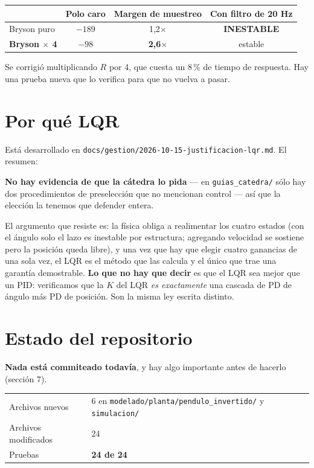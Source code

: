 \documentclass[11pt,a4paper]{article}
\begin{document}
\begin{center}\small
\begin{tabular}{lccc}
\toprule
 & Polo caro & Margen de muestreo & Con filtro de 20 Hz \\
\midrule
Bryson puro & $-189$ & 1,2$\times$ & \textbf{INESTABLE} \\
\textbf{Bryson $\times$ 4} & $-98$ & \textbf{2,6$\times$} & estable \\
\bottomrule
\end{tabular}
\end{center}

Se corrigió multiplicando $R$ por 4, que cuesta un 8\,\% de tiempo de respuesta. Hay una prueba nueva
que lo verifica para que no vuelva a pasar.

\section{Por qué LQR}

Está desarrollado en \texttt{docs/gestion/2026-10-15-justificacion-lqr.md}. El resumen:

\textbf{No hay evidencia de que la cátedra lo pida} --- en \texttt{guias\_catedra/} sólo hay dos
procedimientos de preselección que no mencionan control --- así que la elección la tenemos que
defender entera.

El argumento que resiste es: la física obliga a realimentar los cuatro estados (con el ángulo solo el
lazo es inestable por estructura; agregando velocidad se sostiene pero la posición queda libre), y una
vez que hay que elegir cuatro ganancias de una sola vez, el LQR es el método que las calcula y el
único que trae una garantía demostrable. \textbf{Lo que no hay que decir} es que el LQR sea mejor que
un PID: verificamos que la $K$ del LQR \emph{es exactamente} una cascada de PD de ángulo más PD de
posición. Son la misma ley escrita distinto.

\section{Estado del repositorio}

\textbf{Nada está commiteado todavía}, y hay algo importante antes de hacerlo (sección 7).

\begin{center}\small
\begin{tabular}{ll}
\toprule
Archivos nuevos & 6 en \texttt{modelado/planta/pendulo\_invertido/} y \texttt{simulacion/} \\
Archivos modificados & 24 \\
Pruebas & \textbf{24 de 24} \\
\bottomrule
\end{tabular}
\end{center}
\end{document}
